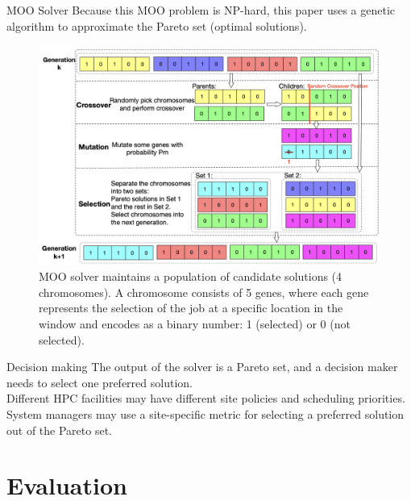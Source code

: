 \documentclass[aspectratio=1610]{beamer}
\begin{document}
\begin{frame}{MOO Solver}
    Because this MOO problem is NP-hard, this paper uses a genetic algorithm to approximate the Pareto set (optimal solutions). \\
    \begin{figure}
        \begin{center}
            \includegraphics[keepaspectratio, scale=0.18]{pic/genetic.png}
            \caption{MOO solver maintains a population of candidate solutions (4 chromosomes). 
            A chromosome consists of 5 genes, where each gene represents the selection of the job at a specific location in the window and encodes as a binary number: 1 (selected) or 0 (not selected).}
            \label{fig:Genetic_Algorithm}
        \end{center}
    \end{figure}
\end{frame}

\begin{frame}{Decision making}
    The output of the solver is a Pareto set, and a decision maker needs to select one preferred solution. \\
    \vspace{10pt}
    Different HPC facilities may have different site policies and scheduling priorities. \\
    \vspace{10pt}
    System managers may use a site-specific metric for selecting a preferred solution out of the Pareto set. 
\end{frame}

\section{Evaluation}
\end{document}

